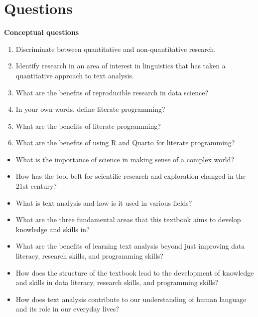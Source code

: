 \documentclass[
  letterpaper,
]{latex/krantz}
\providecommand{\tightlist}{%
  \setlength{\itemsep}{0pt}\setlength{\parskip}{0pt}}\usepackage{longtable,booktabs,array}
\begin{document}
\hypertarget{questions-1}{%
\section*{Questions}\label{questions-1}}


\begin{tcolorbox}[enhanced jigsaw, arc=.35mm, leftrule=.75mm, rightrule=.15mm, opacityback=0, colback=white, breakable, bottomrule=.15mm, left=2mm, toprule=.15mm]

\textbf{Conceptual questions}

\begin{enumerate}
\def\labelenumi{\arabic{enumi}.}
\tightlist
\item
  Discriminate between quantitative and non-quantitative research.
\item
  Identify research in an area of interest in linguistics that has taken
  a quantitative approach to text analysis.
\item
  What are the benefits of reproducible research in data science?
\item
  In your own words, define literate programming?
\item
  What are the benefits of literate programming?
\item
  What are the benefits of using R and Quarto for literate programming?
\end{enumerate}

\begin{itemize}
\tightlist
\item
  What is the importance of science in making sense of a complex world?
\item
  How has the tool belt for scientific research and exploration changed
  in the 21st century?
\item
  What is text analysis and how is it used in various fields?
\item
  What are the three fundamental areas that this textbook aims to
  develop knowledge and skills in?
\item
  What are the benefits of learning text analysis beyond just improving
  data literacy, research skills, and programming skills?
\item
  How does the structure of the textbook lead to the development of
  knowledge and skills in data literacy, research skills, and
  programming skills?
\item
  How does text analysis contribute to our understanding of human
  language and its role in our everyday lives?
\end{itemize}

\end{tcolorbox}
\end{document}
